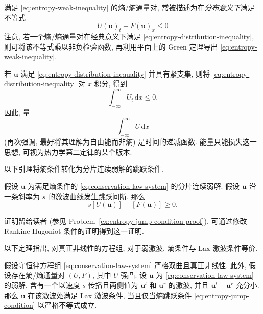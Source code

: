 \begin{Remark}
\label{rem:entropy-distribution-interpretation}
满足 \eqref{eq:entropy-weak-inequality} 的熵/熵通量对, 常被描述为在\emph{分布意义下}满足不等式
\begin{equation}\label{eq:entropy-distribution-inequality}
U(\bm{u})_t+F(\bm{u})_x\leq0
\end{equation}
注意, 若一个熵/熵通量对在经典意义下满足 \eqref{eq:entropy-distribution-inequality}, 则可将该不等式乘以非负检验函数, 再利用平面上的 Green 定理导出 \eqref{eq:entropy-weak-inequality}.
\end{Remark}

\begin{Remark}
\label{rem:entropy-free-energy}
若 $\bm{u}$ 满足 \eqref{eq:entropy-distribution-inequality} 并具有紧支集, 则将 \eqref{eq:entropy-distribution-inequality} 对 $x$ 积分, 得到
\begin{equation}\label{eq:total-entropy-time-derivative}
\int_{-\infty}^\infty U_t\,\mathrm{d}x\leq0.
\end{equation}
因此, 量
\[
\int_{-\infty}^\infty U\,\mathrm{d}x
\]
(再次强调, 最好将其理解为自由能而非熵) 是时间的递减函数. 能量只能损失这一思想, 可视为热力学第二定律的某个版本.
\end{Remark}

以下引理将熵条件转化为分片连续弱解的跳跃条件.

\begin{Lemma}
\label{lem:entropy-jump-condition}
假设 $\bm{u}$ 为满足熵条件的 \eqref{eq:conservation-law-system} 的分片连续弱解. 假设 $\bm{u}$ 沿一条斜率为 $s$ 的激波曲线发生跳跃间断. 那么
\begin{equation}\label{eq:entropy-jump-condition}
s[U(\bm{u})]-[F(\bm{u})]\geq0.
\end{equation}

\end{Lemma}

证明留给读者 (参见 Problem~\ref{ex:entropy-jump-condition-proof}). 可通过修改 Rankine-Hugoniot 条件的证明得到这一证明.

以下定理指出, 对真正非线性的方程组, 对于弱激波, 熵条件与 Lax 激波条件等价.

\begin{Theorem}
\label{thm:entropy-lax-small-shock-equivalence}
假设守恒律方程组 \eqref{eq:conservation-law-system} 严格双曲且真正非线性. 此外, 假设存在熵/熵通量对 $(U,F)$, 其中 $U$ 强凸. 设 $\bm{u}$ 为 \eqref{eq:conservation-law-system} 的弱解, 含有一个以速度 $s$ 传播且两侧值为 $\bm{u}^l$ 和 $\bm{u}^r$ 的激波, 并且 $\bm{u}^l-\bm{u}^r$ 充分小. 那么 $\bm{u}$ 在该激波处满足 Lax 激波条件, 当且仅当熵跳跃条件 \eqref{eq:entropy-jump-condition} 以严格不等式成立.
\end{Theorem}

